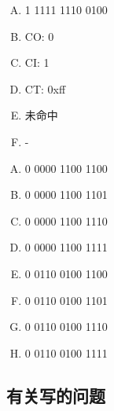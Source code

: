{    %
    \begin{practicec}
        \begin{enumerate}[A.]
            \item 1 1111 1110 0100
            \item CO: 0
            \item CI: 1
            \item CT: 0xff
            \item 未命中
            \item -
        \end{enumerate}
    \end{practicec}

    \begin{practicec}
        \begin{enumerate}[A.]
            \item 0 0000 1100 1100
            \item 0 0000 1100 1101
            \item 0 0000 1100 1110
            \item 0 0000 1100 1111
            \item 0 0110 0100 1100
            \item 0 0110 0100 1101
            \item 0 0110 0100 1110
            \item 0 0110 0100 1111
        \end{enumerate}
    \end{practicec}

    \subsection{有关写的问题}
    {

    }
}
